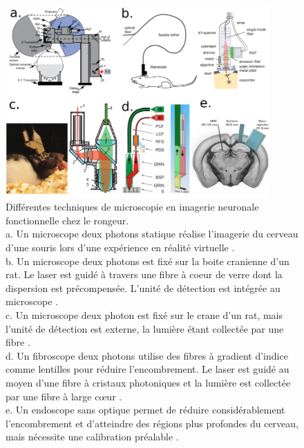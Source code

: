\begin{figure}
\centering
\includegraphics[width=0.9\textwidth]{./files/fiber_functional_imaging.svg.png}
\caption{Différentes techniques de microscopie en imagerie neuronale fonctionnelle chez le rongeur.\\
a. Un microscope deux photons statique réalise l'imagerie du cerveau d'une souris lors d'une expérience en réalité virtuelle \cite{dombeck_functional_2010}.\\
b. Un microscope deux photons est fixé sur la boite cranienne d'un rat. Le laser est guidé à travers une fibre à coeur de verre dont la dispersion est précompensée. L'unité de détection est intégrée au microscope \cite{helmchen_miniature_2001}.\\
c. Un microscope deux photon est fixé sur le crane d'un rat, mais l'unité de détection est externe, la lumière étant collectée par une fibre \cite{sawinski_visually_2009}. \\
d. Un fibroscope deux photons utilise des fibres à gradient d'indice comme lentilles pour réduire l'encombrement. Le laser est guidé au moyen d'une fibre à cristaux photoniques et la lumière est collectée par une fibre à large cœur \cite{engelbrecht_ultra-compact_2008}. \\
e. Un endoscope sans optique permet de réduire considérablement l'encombrement et d'atteindre des régions plus profondes du cerveau, mais nécessite une calibration préalable \cite{turtaev_high-fidelity_2018}.
}
\end{figure}




